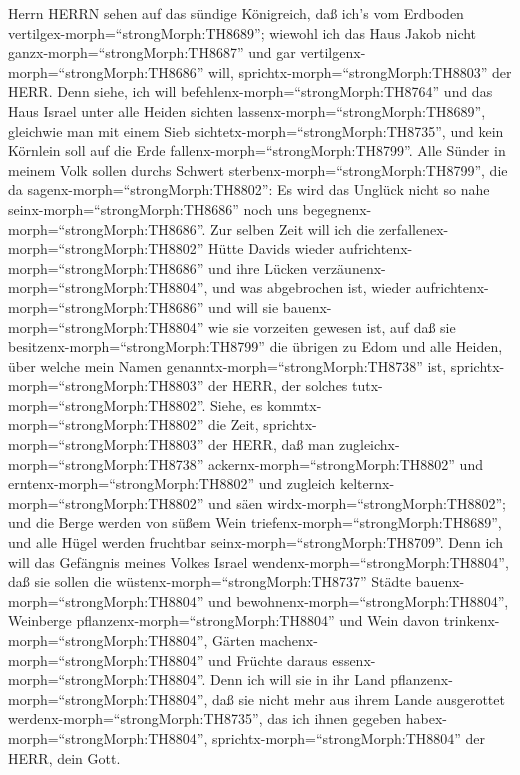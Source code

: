 Herrn HERRN sehen auf das sündige Königreich, daß ich's vom Erdboden
vertilgex-morph=``strongMorph:TH8689''; wiewohl ich das Haus Jakob nicht
ganzx-morph=``strongMorph:TH8687'' und gar
vertilgenx-morph=``strongMorph:TH8686'' will,
sprichtx-morph=``strongMorph:TH8803'' der HERR.  Denn siehe,
ich will befehlenx-morph=``strongMorph:TH8764'' und das Haus Israel
unter alle Heiden sichten lassenx-morph=``strongMorph:TH8689'',
gleichwie man mit einem Sieb sichtetx-morph=``strongMorph:TH8735'', und
kein Körnlein soll auf die Erde fallenx-morph=``strongMorph:TH8799''.
 Alle Sünder in meinem Volk sollen durchs Schwert
sterbenx-morph=``strongMorph:TH8799'', die da
sagenx-morph=``strongMorph:TH8802'': Es wird das Unglück nicht so nahe
seinx-morph=``strongMorph:TH8686'' noch uns
begegnenx-morph=``strongMorph:TH8686''.  Zur selben Zeit
will ich die zerfallenex-morph=``strongMorph:TH8802'' Hütte Davids
wieder aufrichtenx-morph=``strongMorph:TH8686'' und ihre Lücken
verzäunenx-morph=``strongMorph:TH8804'', und was abgebrochen ist, wieder
aufrichtenx-morph=``strongMorph:TH8686'' und will sie
bauenx-morph=``strongMorph:TH8804'' wie sie vorzeiten gewesen ist,
 auf daß sie besitzenx-morph=``strongMorph:TH8799'' die
übrigen zu Edom und alle Heiden, über welche mein Namen
genanntx-morph=``strongMorph:TH8738'' ist,
sprichtx-morph=``strongMorph:TH8803'' der HERR, der solches
tutx-morph=``strongMorph:TH8802''.  Siehe, es
kommtx-morph=``strongMorph:TH8802'' die Zeit,
sprichtx-morph=``strongMorph:TH8803'' der HERR, daß man
zugleichx-morph=``strongMorph:TH8738''
ackernx-morph=``strongMorph:TH8802'' und
erntenx-morph=``strongMorph:TH8802'' und zugleich
kelternx-morph=``strongMorph:TH8802'' und säen
wirdx-morph=``strongMorph:TH8802''; und die Berge werden von süßem Wein
triefenx-morph=``strongMorph:TH8689'', und alle Hügel werden fruchtbar
seinx-morph=``strongMorph:TH8709''.  Denn ich will das
Gefängnis meines Volkes Israel wendenx-morph=``strongMorph:TH8804'', daß
sie sollen die wüstenx-morph=``strongMorph:TH8737'' Städte
bauenx-morph=``strongMorph:TH8804'' und
bewohnenx-morph=``strongMorph:TH8804'', Weinberge
pflanzenx-morph=``strongMorph:TH8804'' und Wein davon
trinkenx-morph=``strongMorph:TH8804'', Gärten
machenx-morph=``strongMorph:TH8804'' und Früchte daraus
essenx-morph=``strongMorph:TH8804''.  Denn ich will sie in
ihr Land pflanzenx-morph=``strongMorph:TH8804'', daß sie nicht mehr aus
ihrem Lande ausgerottet werdenx-morph=``strongMorph:TH8735'', das ich
ihnen gegeben habex-morph=``strongMorph:TH8804'',
sprichtx-morph=``strongMorph:TH8804'' der HERR, dein Gott.
